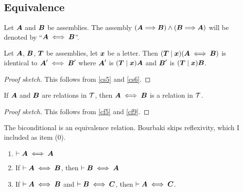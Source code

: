 \subsection{Equivalence}

\begin{definition}
Let $\boldsymbol{A}$ and $\boldsymbol{B}$ be assemblies. The
assembly
$(\boldsymbol{A}\Longrightarrow\boldsymbol{B})\land(\boldsymbol{B}\Longrightarrow\boldsymbol{A})$
will be denoted by ``$\boldsymbol{A}\iff\boldsymbol{B}$''.
\end{definition}

\begin{cs}\label{cs7}%
Let $\boldsymbol{A}$, $\boldsymbol{B}$, $\boldsymbol{T}$ be
assemblies, let $\boldsymbol{x}$ be a letter. Then $(\boldsymbol{T}\mid\boldsymbol{x})(\boldsymbol{A}\iff\boldsymbol{B})$
is identical to $\boldsymbol{A}'\iff\boldsymbol{B}'$ where
$\boldsymbol{A}'$ is $(\boldsymbol{T}\mid\boldsymbol{x})\boldsymbol{A}$
and $\boldsymbol{B}'$ is $(\boldsymbol{T}\mid\boldsymbol{x})\boldsymbol{B}$.
\end{cs}

\begin{proof}[Proof sketch]
This follows from \ref{cs5} and \ref{cs6}.
\end{proof}

\begin{cf}\label{cf10}%
If $\boldsymbol{A}$ and $\boldsymbol{B}$ are relations in $\mathcal{T}$,
then $\boldsymbol{A}\iff\boldsymbol{B}$ is a relation in $\mathcal{T}$.
\end{cf}

\begin{proof}[Proof sketch]
This follows from \ref{cf5} and \ref{cf9}.
\end{proof}

\begin{dc}\label{c22}%
The biconditional is an equivalence relation. Bourbaki skips
reflexivity, which I included as item (0).
\begin{enumerate}[start=0]
\item $\vdash\boldsymbol{A}\iff\boldsymbol{A}$
\item If $\vdash\boldsymbol{A}\iff\boldsymbol{B}$, then $\vdash\boldsymbol{B}\iff\boldsymbol{A}$
\item If $\vdash\boldsymbol{A}\iff\boldsymbol{B}$ and $\vdash\boldsymbol{B}\iff\boldsymbol{C}$,
then $\vdash\boldsymbol{A}\iff\boldsymbol{C}$.
\end{enumerate}
\end{dc}

